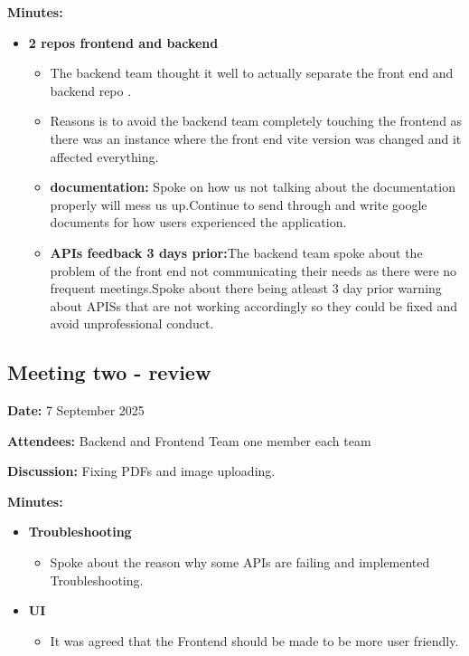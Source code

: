 \textbf{Minutes:}
\begin{itemize}
    \item \textbf{2 repos frontend and backend}
    \begin{itemize}
        \item The backend team thought it well to actually separate the front end and backend repo . 
        \item Reasons is to avoid the backend team completely touching the frontend as there was an instance where the front end vite version was changed and it affected everything.
        \item \textbf{documentation:} Spoke on how us not talking about the documentation properly will mess us up.Continue to send through and write google documents for how users experienced the application.
        \item \textbf{APIs feedback 3 days prior:}The backend team spoke about the problem of the front end not communicating their needs as there were no frequent meetings.Spoke about there being atleast 3 day prior warning about APISs that are not working accordingly so they could be fixed and avoid unprofessional conduct.
    \end{itemize}
\end{itemize}


\subsection{Meeting two - review}

\textbf{Date:} 7 September 2025 \par
\textbf{Attendees:} Backend and Frontend Team one member each team \par
\textbf{Discussion:} Fixing PDFs and image uploading. \par

\textbf{Minutes:}
\begin{itemize}
    \item \textbf{Troubleshooting}
    \begin{itemize}
        \item Spoke about the reason why some APIs are failing and implemented Troubleshooting.
    \end{itemize}

    \item \textbf{UI}
    \begin{itemize}
        \item It was agreed that the Frontend should be made to be more user friendly.
    \end{itemize}

\end{itemize}


